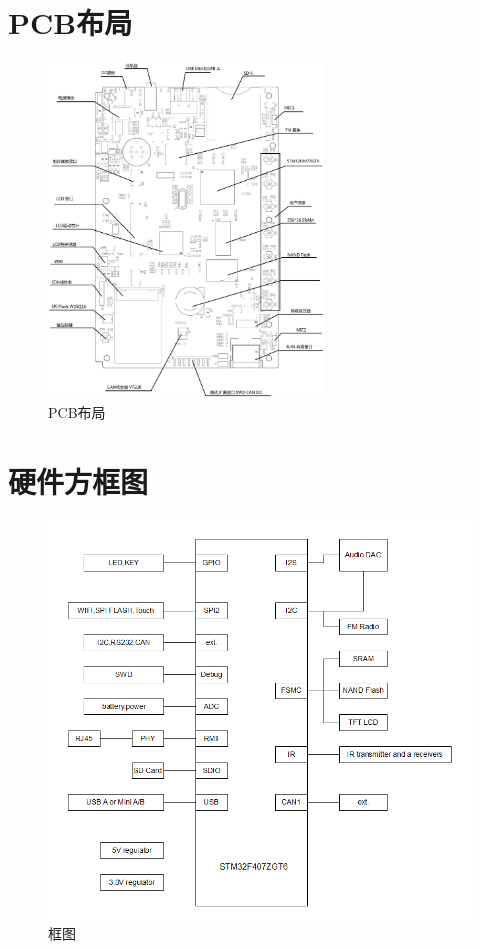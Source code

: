 \documentclass[titlepage]{article}
\begin{document}
\section{PCB布局}

 \begin{figure}[h]
 \centering
 \includegraphics[width=0.65\textwidth]{board_info.eps}
 \caption{PCB布局}
 \end{figure}
\newpage
\section{硬件方框图}

 \begin{figure}[h]
 \centering
 \includegraphics[width=16cm]{bus.png}
 \caption{框图}
 \end{figure}
 \newpage
\end{document}
